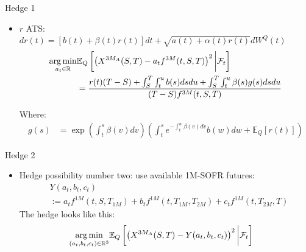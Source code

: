 \documentclass[UKenglish]{beamer}
\newcommand{\E}{\mathbb{E}}  %
\newcommand{\F}{\mathcal{F}} %
\newcommand{\R}{\mathbb{R}}  %
\begin{document}
\begin{frame}{Hedge 1}
\begin{itemize}
    \item $r$ ATS: $dr(t) = [b(t) + \beta(t)r(t)]dt + \sqrt{a(t) + \alpha(t)r(t)}dW^{Q}(t)$ 
\begin{align*}
\underset{a_{t}\in \R}{\arg\min}
&\E_{Q}\left[
\left(
X^{3M_{A}}(S,T)-a_{t}f^{3M}(t,S,T)
\right)^{2}
\bigg{|}\F_{t}
\right] \\ 
&= 
\frac{
r(t)(T-S)
+ \int_{S}^{T}\int_{t}^{u}b(s)dsdu 
+ \int_{S}^{T}\int_{t}^{u}\beta(s)g(s)dsdu
}{
(T-S)f^{3M}(t,S,T)
}
\end{align*}

Where: 
\begin{align*}
g(s) &= \exp\left(
\int_{t}^{s}\beta(v)dv
\right)
\left(
\int_{t}^{s}e^{-\int_{t}^{w}\beta(v)dv}b(w)dw + \E_{Q}[r(t)]
\right) 
\end{align*}

\end{itemize}
\end{frame}


\begin{frame}{Hedge 2}
\begin{itemize}
    \item Hedge possibility number two: use available 1M-SOFR futures: 
\begin{align*}
&Y(a_{t}, b_{t}, c_{t}) \\
&:= 
a_{t}f^{1M}(t,S,T_{1M}) + 
b_{t}f^{1M}(t,T_{1M}, T_{2M}) + 
c_{t}f^{1M}(t,T_{2M}, T)
\end{align*}    
The hedge looks like this: 
\begin{align*}
\underset{(a_{t}, b_{t}, c_{t})\in \R^{3}}{\arg\min}
&\E_{Q}\left[
\left(
X^{3M_{A}}(S,T)-Y(a_{t}, b_{t}, c_{t})
\right)^{2}
\bigg{|}\F_{t}
\right]    
\end{align*}
\end{itemize}
\end{frame}
\end{document}
